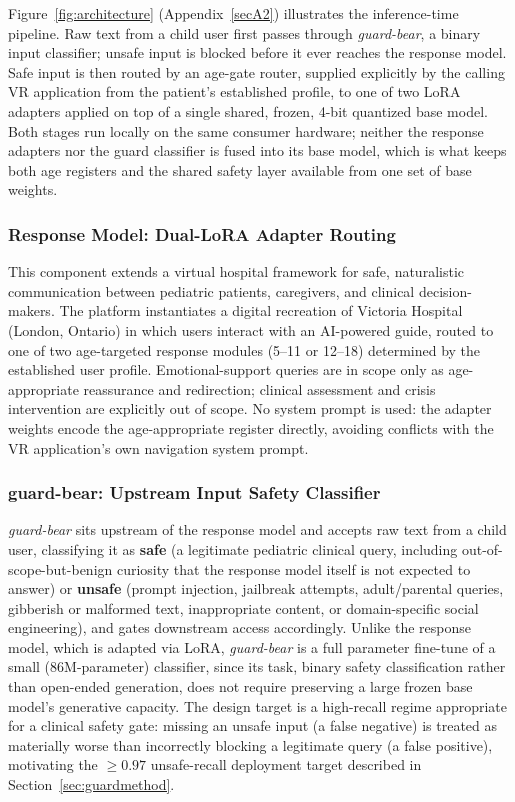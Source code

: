 \documentclass[pdflatex,sn-mathphys-num]{sn-jnl}%
\begin{document}
Figure~\ref{fig:architecture} (Appendix~\ref{secA2}) illustrates the inference-time pipeline. Raw text from a child user first passes through \textit{guard-bear}, a binary input classifier; unsafe input is blocked before it ever reaches the response model. Safe input is then routed by an age-gate router, supplied explicitly by the calling VR application from the patient's established profile, to one of two LoRA adapters applied on top of a single shared, frozen, 4-bit quantized base model. Both stages run locally on the same consumer hardware; neither the response adapters nor the guard classifier is fused into its base model, which is what keeps both age registers and the shared safety layer available from one set of base weights.

\subsubsection{Response Model: Dual-LoRA Adapter Routing}

This component extends a virtual hospital framework for safe, naturalistic communication between pediatric patients, caregivers, and clinical decision-makers. The platform instantiates a digital recreation of Victoria Hospital (London, Ontario) in which users interact with an AI-powered guide, routed to one of two age-targeted response modules (5--11 or 12--18) determined by the established user profile. Emotional-support queries are in scope only as age-appropriate reassurance and redirection; clinical assessment and crisis intervention are explicitly out of scope. No system prompt is used: the adapter weights encode the age-appropriate register directly, avoiding conflicts with the VR application's own navigation system prompt.

\subsubsection{guard-bear: Upstream Input Safety Classifier}\label{subsec:guardarch}

\textit{guard-bear} sits upstream of the response model and accepts raw text from a child user, classifying it as \textbf{safe} (a legitimate pediatric clinical query, including out-of-scope-but-benign curiosity that the response model itself is not expected to answer) or \textbf{unsafe} (prompt injection, jailbreak attempts, adult/parental queries, gibberish or malformed text, inappropriate content, or domain-specific social engineering), and gates downstream access accordingly. Unlike the response model, which is adapted via LoRA, \textit{guard-bear} is a full parameter fine-tune of a small (86M-parameter) classifier, since its task, binary safety classification rather than open-ended generation, does not require preserving a large frozen base model's generative capacity. The design target is a high-recall regime appropriate for a clinical safety gate: missing an unsafe input (a false negative) is treated as materially worse than incorrectly blocking a legitimate query (a false positive), motivating the $\geq 0.97$ unsafe-recall deployment target described in Section~\ref{sec:guardmethod}.
\end{document}
